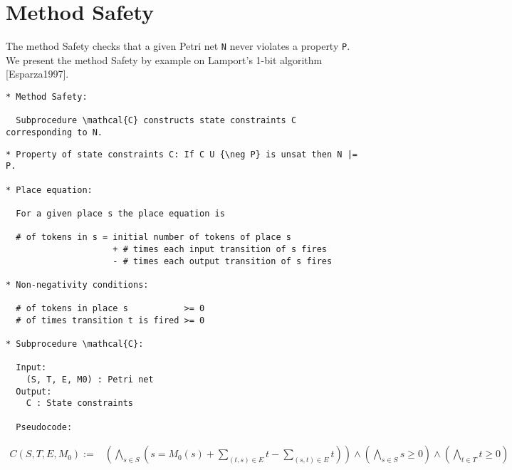 \section{Method Safety}

The method Safety checks that a given Petri net \verb=N= never violates a property \verb=P=.
We present the method Safety by example on Lamport's 1-bit algorithm [Esparza1997].

\begin{verbatim}
* Method Safety:

  Subprocedure \mathcal{C} constructs state constraints C corresponding to N.
\end{verbatim}




\begin{verbatim}
* Property of state constraints C: If C U {\neg P} is unsat then N |= P.

* Place equation:
  
  For a given place s the place equation is

  # of tokens in s = initial number of tokens of place s
                     + # times each input transition of s fires
                     - # times each output transition of s fires

* Non-negativity conditions:

  # of tokens in place s           >= 0
  # of times transition t is fired >= 0

* Subprocedure \mathcal{C}:

  Input:
    (S, T, E, M0) : Petri net
  Output:
    C : State constraints

  Pseudocode:

\end{verbatim}

\begin{align*}
  C(S, T, E, M_0) :=& \left( \bigwedge_{s \in S} \left(
    s = M_0(s) + \sum_{(t, s) \in E} t - \sum_{(s, t) \in E} t
  \right) \right) \land
    \left( \bigwedge_{s \in S} s \ge 0 \right) \land
    \left( \bigwedge_{t \in T} t \ge 0 \right)
\end{align*}

\newpage

